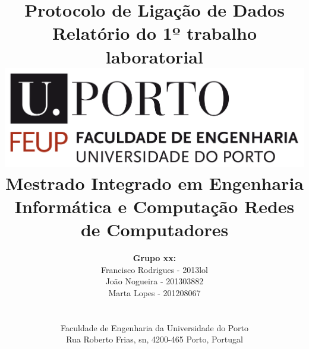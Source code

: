 \documentclass[11pt]{article}
\begin{document}
\setlength{\textwidth}{16cm}
\setlength{\textheight}{22cm}

\title{\Huge\textbf{Protocolo de Ligação de Dados}\linebreak\linebreak\linebreak
\Large\textbf{Relatório do 1º trabalho laboratorial}\linebreak
\linebreak\linebreak
\includegraphics[scale=0.1]{feup-logo.png}\linebreak
\linebreak\linebreak
\Large{Mestrado Integrado em Engenharia Informática e Computação} \linebreak\linebreak
\Large{Redes de Computadores}
}

\author{\textbf{Grupo xx:}\\
Francisco Rodrigues - 2013lol\\
João Nogueira - 201303882 \\
Marta Lopes - 201208067 \\
\linebreak\linebreak \\
 \\ Faculdade de Engenharia da Universidade do Porto \\ Rua Roberto Frias, s\/n, 4200-465 Porto, Portugal \linebreak\linebreak\linebreak
\linebreak\linebreak\vspace{1cm}}

\maketitle
\thispagestyle{empty}

\newpage
\tableofcontents
\newpage
\end{document}
